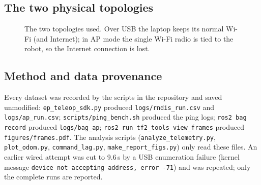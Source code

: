 \documentclass[11pt,a4paper]{article}
\begin{document}
\subsection{The two physical topologies}
\begin{figure}[H]\centering
{}
\caption{The two topologies used. Over USB the laptop keeps its normal Wi-Fi (and Internet); in AP mode the single Wi-Fi radio is tied to the robot, so the Internet connection is lost.}
\end{figure}

\subsection{Method and data provenance}
Every dataset was recorded by the scripts in the repository and saved unmodified:
\texttt{ep\_teleop\_sdk.py} produced \texttt{logs/rndis\_run.csv} and \texttt{logs/ap\_run.csv}; \texttt{scripts/ping\_bench.sh} produced the ping logs; \texttt{ros2 bag record} produced \texttt{logs/bag\_ap}; \texttt{ros2 run tf2\_tools view\_frames} produced \texttt{figures/frames.pdf}. The analysis scripts (\texttt{analyze\_telemetry.py}, \texttt{plot\_odom.py}, \texttt{command\_lag.py}, \texttt{make\_report\_figs.py}) only read these files.
An earlier wired attempt was cut to 9.6\,s by a USB enumeration failure (kernel message \texttt{device not accepting address, error -71}) and was repeated; only the complete runs are reported.
\end{document}
